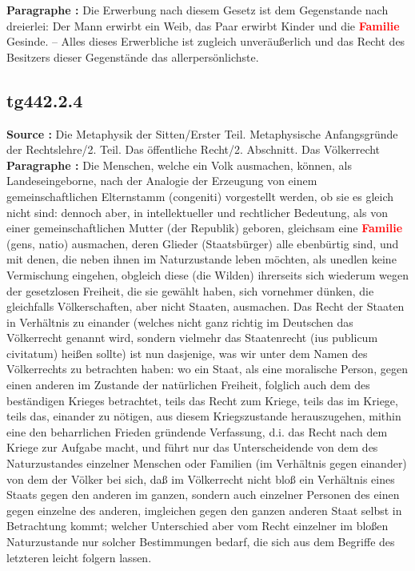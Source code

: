 \documentclass[a4paper,12pt,twoside]{book}
\newcommand{\match}[1]{\textcolor{red}{\textbf{#1}}}
\begin{document}
	\textbf{Paragraphe : }Die Erwerbung nach diesem Gesetz ist dem Gegenstande nach dreierlei: Der Mann erwirbt ein Weib, das Paar erwirbt Kinder und die \match{Familie} Gesinde. – Alles dieses Erwerbliche ist zugleich unveräußerlich und das Recht des Besitzers dieser Gegenstände das allerpersönlichste. 
	
	\subsection*{tg442.2.4} 
	\textbf{Source : }Die Metaphysik der Sitten/Erster Teil. Metaphysische Anfangsgründe der Rechtslehre/2. Teil. Das öffentliche Recht/2. Abschnitt. Das Völkerrecht\\  
	
	\textbf{Paragraphe : }Die Menschen, welche ein Volk ausmachen, können, als Landeseingeborne, nach der Analogie der Erzeugung von einem gemeinschaftlichen Elternstamm (congeniti) vorgestellt werden, ob sie es gleich nicht sind: dennoch aber, in intellektueller und rechtlicher Bedeutung, als von einer gemeinschaftlichen Mutter (der Republik) geboren, gleichsam eine \match{Familie} (gens, natio) ausmachen, deren Glieder (Staatsbürger) alle ebenbürtig sind, und mit denen, die neben ihnen im Naturzustande leben möchten, als unedlen keine Vermischung eingehen, obgleich diese (die Wilden) ihrerseits sich wiederum wegen der gesetzlosen Freiheit, die sie gewählt haben, sich vornehmer dünken, die gleichfalls Völkerschaften, aber nicht Staaten, ausmachen. Das Recht der Staaten in Verhältnis zu einander (welches nicht ganz richtig im Deutschen das Völkerrecht genannt wird, sondern vielmehr das Staatenrecht (ius publicum civitatum) heißen sollte) ist nun dasjenige, was wir unter dem Namen des Völkerrechts zu betrachten haben: wo ein Staat, als eine moralische Person, gegen einen anderen im Zustande der natürlichen Freiheit, folglich auch dem des beständigen Krieges betrachtet, teils das Recht zum Kriege, teils das im Kriege, teils das, einander zu nötigen, aus diesem Kriegszustande herauszugehen, mithin eine den beharrlichen Frieden gründende Verfassung, d.i. das Recht nach dem Kriege zur Aufgabe macht, und führt nur das Unterscheidende von dem des Naturzustandes einzelner Menschen oder Familien (im Verhältnis gegen einander) von dem der Völker bei sich, daß im Völkerrecht nicht bloß ein Verhältnis eines Staats gegen den anderen im ganzen, sondern auch einzelner Personen des einen gegen einzelne des anderen, imgleichen gegen den ganzen anderen Staat selbst in Betrachtung kommt; welcher Unterschied aber vom Recht einzelner im  bloßen Naturzustande nur solcher Bestimmungen bedarf, die sich aus dem Begriffe des letzteren leicht folgern lassen. 
	
\end{document}
